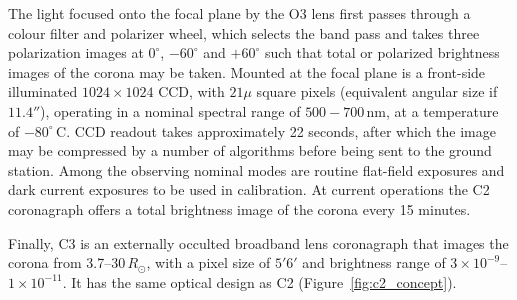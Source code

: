 The light focused onto the focal plane by the O3 lens first passes through a colour filter and polarizer wheel, which selects the band pass and takes three polarization images at $0^{\circ}$, $-60^{\circ}$ and $+60^{\circ}$ such that total or polarized brightness images of the corona may be taken. Mounted at the focal plane is a front-side illuminated $1024\times1024$ CCD, with $21\mu$ square pixels (equivalent angular size if $11.4''$),  operating in a nominal spectral range of $500-700$\,nm, at a temperature of $-80^{\circ}$\,C. CCD readout takes approximately 22 seconds, after which the image may be compressed by a number of algorithms before being sent to the ground station. Among the observing nominal modes are routine flat-field exposures and dark current exposures to be used in calibration. At current operations the C2 coronagraph offers a total brightness image of the corona every 15 minutes.  

Finally, C3 is an externally occulted broadband lens coronagraph that images the corona from 3.7--30$\,R_{\odot}$, with a pixel size of $5'6'$ and brightness range of $3\times10^{-9}$--$1\times10^{-11}$. It has the same optical design as C2 (Figure~\ref{fig:c2_concept}).

